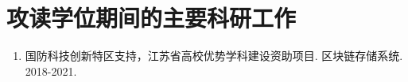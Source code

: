 \chapter{攻读学位期间的主要科研工作}
\begin{enumerate}
	\item 国防科技创新特区支持，江苏省高校优势学科建设资助项目. 区块链存储系统. 2018-2021.
\end{enumerate}